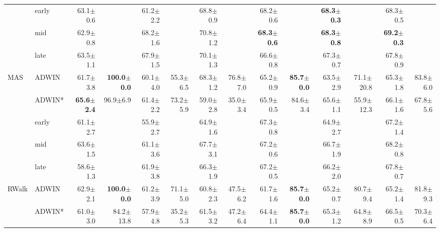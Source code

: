 \begin{tabular}{llrrrrrrrrrrrr}
 & early & 63.1\tiny{$\pm$0.6} &  & 61.2\tiny{$\pm$2.2} &  & 68.8\tiny{$\pm$0.9} &  & 68.2\tiny{$\pm$0.6} &  & \textbf{68.3\tiny{$\pm$0.3}} &  & 68.3\tiny{$\pm$0.5} &  \\
 & mid & 62.9\tiny{$\pm$0.8} &  & 68.2\tiny{$\pm$1.6} &  & 70.8\tiny{$\pm$1.2} &  & \textbf{68.3\tiny{$\pm$0.6}} &  & \textbf{68.3\tiny{$\pm$0.8}} &  & \textbf{69.2\tiny{$\pm$0.3}} &  \\
 & late & 63.5\tiny{$\pm$1.1} &  & 67.9\tiny{$\pm$1.5} &  & 70.1\tiny{$\pm$1.3} &  & 66.6\tiny{$\pm$0.8} &  & 67.3\tiny{$\pm$0.7} &  & 67.8\tiny{$\pm$0.9} &  \\
\midrule
\multirow[t]{5}{*}{MAS} & ADWIN & 61.7\tiny{$\pm$3.8} & \textbf{100.0\tiny{$\pm$0.0}} & 60.1\tiny{$\pm$4.0} & 55.3\tiny{$\pm$6.5} & 68.3\tiny{$\pm$1.2} & 76.8\tiny{$\pm$7.0} & 65.2\tiny{$\pm$0.9} & \textbf{85.7\tiny{$\pm$0.0}} & 63.5\tiny{$\pm$2.9} & 71.1\tiny{$\pm$20.8} & 65.3\tiny{$\pm$1.8} & 83.8\tiny{$\pm$6.0} \\
 & ADWIN* & \textbf{65.6\tiny{$\pm$2.4}} & 96.9\tiny{$\pm$6.9} & 61.4\tiny{$\pm$2.2} & 73.2\tiny{$\pm$5.9} & 59.0\tiny{$\pm$2.8} & 35.0\tiny{$\pm$3.4} & 65.9\tiny{$\pm$0.5} & 84.6\tiny{$\pm$3.4} & 65.6\tiny{$\pm$1.1} & 55.9\tiny{$\pm$12.3} & 66.1\tiny{$\pm$1.6} & 67.8\tiny{$\pm$5.6} \\
 & early & 61.1\tiny{$\pm$2.7} &  & 55.9\tiny{$\pm$2.7} &  & 64.9\tiny{$\pm$1.6} &  & 67.3\tiny{$\pm$0.8} &  & 64.9\tiny{$\pm$2.7} &  & 67.2\tiny{$\pm$1.4} &  \\
 & mid & 63.6\tiny{$\pm$1.5} &  & 61.1\tiny{$\pm$3.6} &  & 67.7\tiny{$\pm$3.1} &  & 67.2\tiny{$\pm$0.6} &  & 66.7\tiny{$\pm$1.9} &  & 68.2\tiny{$\pm$0.8} &  \\
 & late & 58.6\tiny{$\pm$1.3} &  & 61.9\tiny{$\pm$3.8} &  & 66.3\tiny{$\pm$1.9} &  & 67.2\tiny{$\pm$0.5} &  & 66.2\tiny{$\pm$2.0} &  & 67.8\tiny{$\pm$0.7} &  \\
\midrule
\multirow[t]{5}{*}{RWalk} & ADWIN & 62.9\tiny{$\pm$2.1} & \textbf{100.0\tiny{$\pm$0.0}} & 61.2\tiny{$\pm$3.9} & 71.1\tiny{$\pm$5.0} & 60.8\tiny{$\pm$2.3} & 47.5\tiny{$\pm$6.2} & 61.7\tiny{$\pm$1.6} & \textbf{85.7\tiny{$\pm$0.0}} & 65.2\tiny{$\pm$0.7} & 80.7\tiny{$\pm$9.4} & 65.2\tiny{$\pm$1.4} & 81.8\tiny{$\pm$9.3} \\
 & ADWIN* & 61.0\tiny{$\pm$3.0} & 84.2\tiny{$\pm$13.8} & 57.9\tiny{$\pm$4.8} & 35.2\tiny{$\pm$5.3} & 61.5\tiny{$\pm$3.2} & 47.2\tiny{$\pm$6.4} & 64.4\tiny{$\pm$1.1} & \textbf{85.7\tiny{$\pm$0.0}} & 65.3\tiny{$\pm$1.2} & 64.8\tiny{$\pm$8.9} & 66.5\tiny{$\pm$0.5} & 70.3\tiny{$\pm$6.4} \\

\end{tabular}
